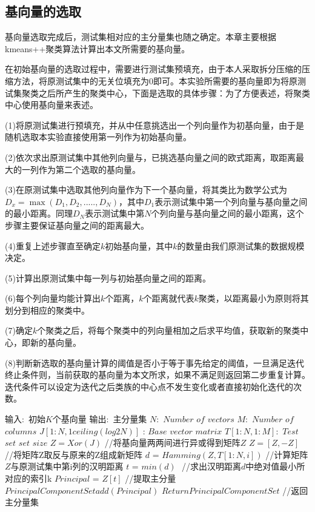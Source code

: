 \subsection{基向量的选取}

基向量选取完成后，测试集相对应的主分量集也随之确定。本章主要根据kmeans++聚类算法计算出本文所需要的基向量。

在初始基向量的选取过程中，需要进行测试集预填充，由于本人采取拆分压缩的压缩方法，将原测试集中的无关位填充为0即可。本实验所需要的基向量即为将原测试集聚类之后所产生的聚类中心，下面是选取的具体步骤：为了方便表述，将聚类中心使用基向量来表述。

(1)将原测试集进行预填充，并从中任意挑选出一个列向量作为初基向量，由于是随机选取本实验直接使用第一列作为初始基向量。

(2)依次求出原测试集中其他列向量与，已挑选基向量之间的欧式距离，取距离最大的一列作为第二个选取的基向量。

(3)在原测试集中选取其他列向量作为下一个基向量，将其类比为数学公式为$D_x=\max⁡(D_1,D_2,.....,D_N)$，其中$D_1$表示测试集中第一个列向量与基向量之间的最小距离。同理$D_N$表示测试集中第$N$个列向量与基向量之间的最小距离，这个步骤主要保证基向量之间的距离最大。

(4)重复上述步骤直至确定$k$初始基向量，其中$k$的数量由我们原测试集的数据规模决定。

(5)计算出原测试集中每一列与初始基向量之间的距离。

(6)每个列向量均能计算出$k$个距离，$k$个距离就代表$k$聚类，以距离最小为原则将其划分到相应的聚类中。

(7)确定$k$个聚类之后，将每个聚类中的列向量相加之后求平均值，获取新的聚类中心，即新的基向量。

(8)判断新选取的基向量计算的阈值是否小于等于事先给定的阈值，一旦满足迭代终止条件则，当前获取的基向量为本文所求，如果不满足则返回第二步重复计算。迭代条件可以设定为迭代之后类族的中心点不发生变化或者直接初始化迭代的次数。

\vspace{\baselineskip}
\begin{algorithm}[!h]
	\caption{$PrincipalComponentSetGenerationl$ $(T)$}%
	\begin{algorithmic}%
        \STATE 输入$:$   $ $初始$K$个基向量
        \STATE 输出$:$   $ $主分量集
        \STATE $N:$ $Number$ $of$ $vectors$
		\STATE $M:$ $Number$ $of$ $columns$
        \STATE $J[1:N,1 ceiling(log2N)]$ : $Base$ $vector$ $matrix$
        \STATE $T[1:N, 1:M]:$ $Test$ $set$ $set$ $size$
        \STATE $Z=Xor(J)$     //将基向量两两间进行异或得到矩阵$Z$
        \STATE $Z=[Z,-Z]$    //将矩阵Z取反与原来的Z组成新矩阵
        \STATE $d$ = $Hamming(Z,T[1:N, i])$     //计算矩阵$Z$与原测试集中第i列的汉明距离
        \STATE $t$ = $min(d)$         $    $  //求出汉明距离$d$中绝对值最小所对应的索引k
        \STATE $Principal$ = $Z[t]$ //提取主分量
        \STATE $PrincipalComponentSet add(Principal)$
		\ENDFOR
        \STATE $Return PrincipalComponentSet$  //返回主分量集
	\end{algorithmic}
\end{algorithm}

